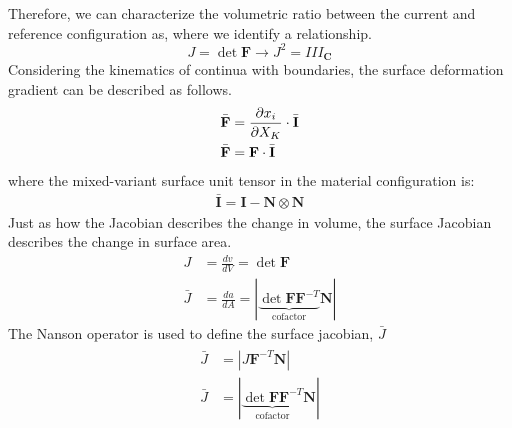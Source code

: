 \documentclass[12pt,3p]{article}
\numberwithin{equation}{section}
\begin{document}
Therefore, we can characterize the volumetric ratio between the current and reference configuration as, where we identify a relationship. 
\begin{equation}
J = \det \mathbf{F} \rightarrow J^2 = III_\mathbf{C}
\end{equation}
Considering the kinematics of continua with boundaries, the surface deformation gradient can be described as follows.
\begin{subequations}\label{EqDefGradSurf}
\begin{align}
\bar{\mathbf{F}} &= \pdv{x_i}{X_K} \cdot \bar{\mathbf{I}} \\
\bar{\mathbf{F}} &= \mathbf{F} \cdot \bar{\mathbf{I}}
\end{align}
\end{subequations}
where the mixed-variant surface unit tensor in the material configuration is:
\begin{align}\label{EqSurfUnitTensor}
\bar{\mathbf{I}} = \mathbf{I} - \mathbf{N} \otimes \mathbf{N}
\end{align}
Just as how the Jacobian describes the change in volume, the surface Jacobian describes the change in surface area. 
\begin{subequations}\label{EqJBulkSurf}
\begin{align}
J &= \frac{dv}{dV} = \det \mathbf{F} \\
\bar{J} &= \frac{da}{dA} = | \underbrace{\det \mathbf{F} \mathbf{F}^{-T}}_\text{cofactor} \mathbf{N} | 
\end{align}
\end{subequations}
The Nanson operator is used to define the surface jacobian, $\bar{J}$
\begin{align}\label{surfaceJacobian}
\begin{split}
\bar{J} &= | J \mathbf{F}^{-T} \mathbf{N} | \\
\bar{J} &= | \underbrace{\det \mathbf{F} \mathbf{F}^{-T}}_\text{cofactor} \mathbf{N} | 
\end{split}	   
\end{align}


\end{document}
